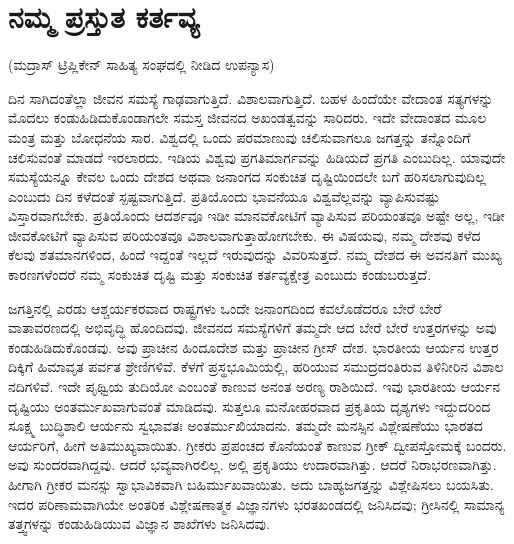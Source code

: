 
\chapter{ನಮ್ಮ ಪ್ರಸ್ತುತ ಕರ್ತವ್ಯ}

\begin{center}
(ಮದ್ರಾಸ್​ ಟ್ರಿಪ್ಲಿಕೇನ್​ ಸಾಹಿತ್ಯ ಸಂಘದಲ್ಲಿ ನೀಡಿದ ಉಪನ್ಯಾಸ)
\end{center}

ದಿನ ಸಾಗಿದಂತೆಲ್ಲಾ ಜೀವನ ಸಮಸ್ಯೆ ಗಾಢವಾಗುತ್ತಿದೆ. ವಿಶಾಲವಾಗುತ್ತಿದೆ. ಬಹಳ ಹಿಂದೆಯೇ ವೇದಾಂತ ಸತ್ಯಗಳನ್ನು ಮೊದಲು ಕಂಡುಹಿಡಿದುಕೊಂಡಾಗಲೇ ಸಮಸ್ತ ಜೀವನದ ಅಖಂಡತ್ವವನ್ನು ಸಾರಿದರು. ಇದೇ ವೇದಾಂತದ ಮೂಲ ಮಂತ್ರ ಮತ್ತು ಬೋಧನೆಯ ಸಾರ. ವಿಶ್ವದಲ್ಲಿ ಒಂದು ಪರಮಾಣುವು ಚಲಿಸುವಾಗಲೂ ಜಗತ್ತನ್ನು ತನ್ನೊಂದಿಗೆ ಚಲಿಸುವಂತೆ ಮಾಡದೆ ಇರಲಾರದು. ಇಡಿಯ ವಿಶ್ವವು ಪ್ರಗತಿಮಾರ್ಗವನ್ನು ಹಿಡಿಯದೆ ಪ್ರಗತಿ ಎಂಬುದಿಲ್ಲ. ಯಾವುದೇ ಸಮಸ್ಯೆಯನ್ನೂ ಕೇವಲ ಒಂದು ದೇಶದ ಅಥವಾ ಜನಾಂಗದ ಸಂಕುಚಿತ ದೃಷ್ಟಿಯಿಂದಲೇ ಬಗೆ ಹರಿಸಲಾಗುವುದಿಲ್ಲ ಎಂಬುದು ದಿನ ಕಳೆದಂತೆ ಸ್ಪಷ್ಟವಾಗುತ್ತಿದೆ. ಪ್ರತಿಯೊಂದು ಭಾವನೆಯೂ ವಿಶ್ವವೆಲ್ಲವನ್ನು ವ್ಯಾಪಿಸುವಷ್ಟು ವಿಸ್ತಾರವಾಗಬೇಕು. ಪ್ರತಿಯೊಂದು ಆದರ್ಶವೂ ಇಡೀ ಮಾನವಕೋಟಿಗೆ ವ್ಯಾಪಿಸುವ ಪರಿಯಂತವೂ ಅಷ್ಟೇ ಅಲ್ಲ, ಇಡೀ ಜೀವಕೋಟಿಗೆ ವ್ಯಾಪಿಸುವ ಪರಿಯಂತವೂ ವಿಶಾಲವಾಗುತ್ತಾಹೋಗಬೇಕು. ಈ ವಿಷಯವು, ನಮ್ಮ ದೇಶವು ಕಳೆದ ಕೆಲವು ಶತಮಾನಗಳಿಂದ, ಹಿಂದೆ ಇದ್ದಂತೆ ಇಲ್ಲದೆ ಇರುವುದನ್ನು ವಿವರಿಸುತ್ತದೆ. ನಮ್ಮ ದೇಶದ ಈ ಅವನತಿಗೆ ಮುಖ್ಯ ಕಾರಣಗಳೆಂದರೆ ನಮ್ಮ ಸಂಕುಚಿತ ದೃಷ್ಟಿ ಮತ್ತು ಸಂಕುಚಿತ ಕರ್ತವ್ಯಕ್ಷೇತ್ರ ಎಂಬುದು ಕಂಡುಬರುತ್ತದೆ.

ಜಗತ್ತಿನಲ್ಲಿ ಎರಡು ಆಶ್ಚರ್ಯಕರವಾದ ರಾಷ್ಟ್ರಗಳು ಒಂದೇ ಜನಾಂಗದಿಂದ ಕವಲೊಡೆದರೂ ಬೇರೆ ಬೇರೆ ವಾತಾವರಣದಲ್ಲಿ ಅಭಿವೃದ್ಧಿ ಹೊಂದಿದವು. ಜೀವನದ ಸಮಸ್ಯೆಗಳಿಗೆ ತಮ್ಮದೇ ಆದ ಬೇರೆ ಬೇರೆ ಉತ್ತರಗಳನ್ನು ಅವು ಕಂಡುಹಿಡಿದುಕೊಂಡವು. ಅವು ಪ್ರಾಚೀನ ಹಿಂದೂದೇಶ ಮತ್ತು ಪ್ರಾಚೀನ ಗ್ರೀಸ್​ ದೇಶ. ಭಾರತೀಯ ಆರ್ಯನ ಉತ್ತರ ದಿಕ್ಕಿಗೆ ಹಿಮಾವೃತ ಪರ್ವತ ಶ್ರೇಣಿಗಳಿವೆ. ಕೆಳಗೆ ಪ್ರಸ್ಥಭೂಮಿಯಲ್ಲಿ, ಹರಿಯುವ ಸಮುದ್ರದಂತಿರುವ ತಿಳಿನೀರಿನ ವಿಶಾಲ ನದಿಗಳಿವೆ. ಇದೇ ಪೃಥ್ವಿಯ ತುದಿಯೋ ಎಂಬಂತೆ ಕಾಣುವ ಅನಂತ ಅರಣ್ಯ ರಾಶಿಯಿದೆ. ಇವು ಭಾರತೀಯ ಆರ್ಯನ ದೃಷ್ಟಿಯು ಅಂತರ್ಮುಖವಾಗುವಂತೆ ಮಾಡಿದವು. ಸುತ್ತಲೂ ಮನೋಹರವಾದ ಪ್ರಕೃತಿಯ ದೃಶ್ಯಗಳು ಇದ್ದುದರಿಂದ ಸೂಕ್ಷ್ಮ ಬುದ್ಧಿಶಾಲಿ ಆರ್ಯನು ಸ್ವಭಾವತಃ ಅಂತರ್ಮುಖಿಯಾದನು. ತಮ್ಮದೇ ಮನಸ್ಸಿನ ವಿಶ್ಲೇಷಣೆಯು ಭಾರತದ ಆರ್ಯರಿಗೆ, ಹೀಗೆ ಅತಿಮುಖ್ಯವಾಯಿತು. ಗ್ರೀಕರು ಪ್ರಪಂಚದ ಕೊನೆಯಂತೆ ಕಾಣುವ ಗ್ರೀಕ್​ ದ್ವೀಪಸ್ತೋಮಕ್ಕೆ ಬಂದರು. ಅವು ಸುಂದರವಾಗಿದ್ದವು. ಆದರೆ ಭವ್ಯವಾಗಿರಲಿಲ್ಲ. ಅಲ್ಲಿ ಪ್ರಕೃತಿಯು ಉದಾರವಾಗಿತ್ತು. ಆದರೆ ನಿರಾಭರಣವಾಗಿತ್ತು. ಹೀಗಾಗಿ ಗ್ರೀಕರ ಮನಸ್ಸು ಸ್ವಾಭಾವಿಕವಾಗಿ ಬಹಿರ್ಮುಖವಾಯಿತು. ಅದು ಬಾಹ್ಯಜಗತ್ತನ್ನು ವಿಶ್ಲೇಷಿಸಲು ಬಯಸಿತು. ಇದರ ಪರಿಣಾಮವಾಗಿಯೇ ಅಂತರಿಕ ವಿಶ್ಲೇಷಣಾತ್ಮಕ ವಿಜ್ಞಾನಗಳು  ಭರತಖಂಡದಲ್ಲಿ ಜನಿಸಿದವು; ಗ್ರೀಸಿನಲ್ಲಿ ಸಾಮಾನ್ಯ ತತ್ತ್ವಗಳನ್ನು ಕಂಡುಹಿಡಿಯುವ ವಿಜ್ಞಾನ ಶಾಖೆಗಳು  ಜನಿಸಿದವು.

